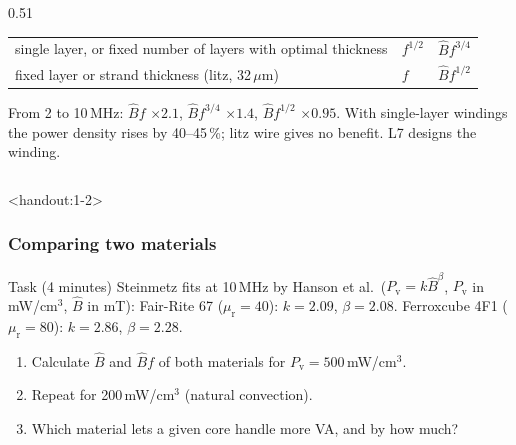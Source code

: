 \begin{frame}
\begin{columns}[T]
\begin{column}{0.51\textwidth}
\begin{table}
\begin{tabular}{|>{\raggedright\arraybackslash}p{3.6cm}|l|l|}
					single layer, or fixed number of layers with optimal thickness & $f^{1/2}$       & $\hat{B}f^{3/4}$ \\
					fixed layer or strand thickness (litz, 32\,$\mu$m)      & $f$                    & $\hat{B}f^{1/2}$ \\
					\hline
				\end{tabular}
			\end{table}
			From 2 to 10\,MHz: $\hat{B}f$ $\times2.1$, $\hat{B}f^{3/4}$ $\times1.4$, $\hat{B}f^{1/2}$ $\times0.95$. With single-layer windings the power density rises by 40--45\,\%; litz wire gives no benefit. L7 designs the winding.
		\end{column}
	\end{columns}
\end{frame}

\begin{frame}<handout:1-2>
	\frametitle{Comparing two materials}
	\begin{block}{Task (4 minutes)}
		Steinmetz fits at 10\,MHz by Hanson et al.\ ($P_\mathrm{v}=k\hat{B}^{\beta}$, $P_\mathrm{v}$ in mW/cm$^3$, $\hat{B}$ in mT): Fair-Rite 67 ($\mu_\mathrm{r}=40$): $k=2.09$, $\beta=2.08$. Ferroxcube 4F1 ($\mu_\mathrm{r}=80$): $k=2.86$, $\beta=2.28$.
		\begin{enumerate}
			\item Calculate $\hat{B}$ and $\hat{B}f$ of both materials for $P_\mathrm{v}=500$\,mW/cm$^3$.
			\item Repeat for 200\,mW/cm$^3$ (natural convection).
			\item Which material lets a given core handle more VA, and by how much?
		\end{enumerate}
	\end{block}
\end{frame}

